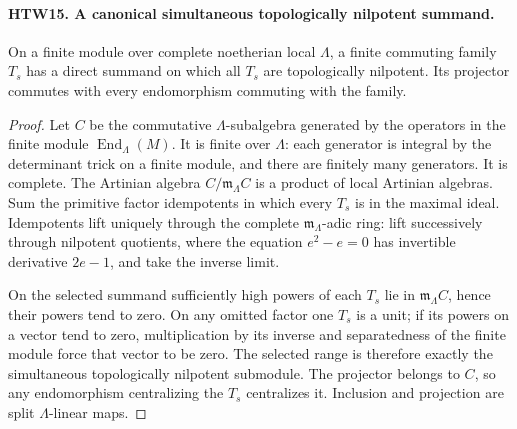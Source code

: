 \documentclass[11pt,a4paper]{article}
\numberwithin{equation}{section}
\theoremstyle{remark}\newtheorem{remark}[theorem]{Remark}
\begin{document}
\paragraph{HTW15. A canonical simultaneous topologically nilpotent summand.}
\label{claim:HTW15}
On a finite module over complete noetherian local \(\Lambda\),
a finite commuting family \(T_s\) has a direct summand
on which all \(T_s\) are topologically nilpotent.
Its projector commutes with every endomorphism commuting
with the family.
\begin{proof}
Let \(C\) be the commutative \(\Lambda\)-subalgebra generated
by the operators in the finite module
\(\operatorname{End}_\Lambda(M)\).  It is finite over
\(\Lambda\): each generator is integral by the determinant
trick on a finite module, and there are finitely many
generators.  It is complete.  The Artinian algebra
\(C/\mathfrak m_\Lambda C\) is a product of local
Artinian algebras.  Sum the primitive factor idempotents
in which every \(T_s\) is in the maximal ideal.
Idempotents lift uniquely through the complete
\(\mathfrak m_\Lambda\)-adic ring: lift successively
through nilpotent quotients, where the equation
\(e^2-e=0\) has invertible derivative \(2e-1\), and
take the inverse limit.

On the selected summand sufficiently high powers of
each \(T_s\) lie in \(\mathfrak m_\Lambda C\), hence
their powers tend to zero.  On any omitted factor
one \(T_s\) is a unit; if its powers on a vector tend
to zero, multiplication by its inverse and separatedness
of the finite module force that vector to be zero.
The selected range is therefore exactly the
simultaneous topologically nilpotent submodule.
The projector belongs to \(C\), so any endomorphism
centralizing the \(T_s\) centralizes it.  Inclusion
and projection are split \(\Lambda\)-linear maps.
\end{proof}

\end{document}
